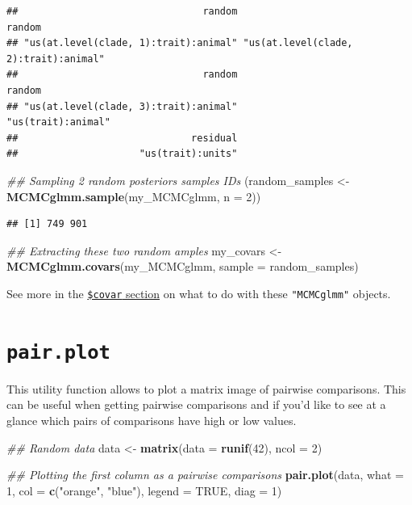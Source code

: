\documentclass[
]{book}
\newenvironment{Shaded}{\begin{snugshade}}{\end{snugshade}}
\newcommand{\CommentTok}[1]{\textcolor[rgb]{0.56,0.35,0.01}{\textit{#1}}}
\newcommand{\DataTypeTok}[1]{\textcolor[rgb]{0.13,0.29,0.53}{#1}}
\newcommand{\DecValTok}[1]{\textcolor[rgb]{0.00,0.00,0.81}{#1}}
\newcommand{\KeywordTok}[1]{\textcolor[rgb]{0.13,0.29,0.53}{\textbf{#1}}}
\newcommand{\NormalTok}[1]{#1}
\newcommand{\OtherTok}[1]{\textcolor[rgb]{0.56,0.35,0.01}{#1}}
\newcommand{\StringTok}[1]{\textcolor[rgb]{0.31,0.60,0.02}{#1}}
\begin{document}
\begin{verbatim}
##                                random                                random 
## "us(at.level(clade, 1):trait):animal" "us(at.level(clade, 2):trait):animal" 
##                                random                                random 
## "us(at.level(clade, 3):trait):animal"                    "us(trait):animal" 
##                              residual 
##                     "us(trait):units"
\end{verbatim}

\begin{Shaded}
\begin{Highlighting}[]
\CommentTok{\#\# Sampling 2 random posteriors samples IDs}
\NormalTok{(random\_samples \textless{}{-}}\StringTok{ }\KeywordTok{MCMCglmm.sample}\NormalTok{(my\_MCMCglmm, }\DataTypeTok{n =} \DecValTok{2}\NormalTok{))}
\end{Highlighting}
\end{Shaded}

\begin{verbatim}
## [1] 749 901
\end{verbatim}

\begin{Shaded}
\begin{Highlighting}[]
\CommentTok{\#\# Extracting these two random amples}
\NormalTok{my\_covars \textless{}{-}}\StringTok{ }\KeywordTok{MCMCglmm.covars}\NormalTok{(my\_MCMCglmm, }\DataTypeTok{sample =}\NormalTok{ random\_samples)}
\end{Highlighting}
\end{Shaded}

See more in the \protect\hyperlink{covar}{\texttt{\$covar} section} on what to do with these \texttt{"MCMCglmm"} objects.

\hypertarget{pair.plot}{%
\section{\texorpdfstring{\texttt{pair.plot}}{pair.plot}}\label{pair.plot}}

This utility function allows to plot a matrix image of pairwise comparisons.
This can be useful when getting pairwise comparisons and if you'd like to see at a glance which pairs of comparisons have high or low values.

\begin{Shaded}
\begin{Highlighting}[]
\CommentTok{\#\# Random data}
\NormalTok{data \textless{}{-}}\StringTok{ }\KeywordTok{matrix}\NormalTok{(}\DataTypeTok{data =} \KeywordTok{runif}\NormalTok{(}\DecValTok{42}\NormalTok{), }\DataTypeTok{ncol =} \DecValTok{2}\NormalTok{)}

\CommentTok{\#\# Plotting the first column as a pairwise comparisons}
\KeywordTok{pair.plot}\NormalTok{(data, }\DataTypeTok{what =} \DecValTok{1}\NormalTok{, }\DataTypeTok{col =} \KeywordTok{c}\NormalTok{(}\StringTok{"orange"}\NormalTok{, }\StringTok{"blue"}\NormalTok{), }\DataTypeTok{legend =} \OtherTok{TRUE}\NormalTok{,}
          \DataTypeTok{diag =} \DecValTok{1}\NormalTok{)}
\end{Highlighting}
\end{Shaded}
\end{document}
